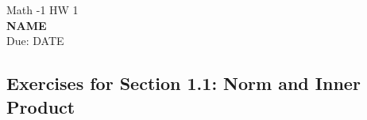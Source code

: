 




\begin{center}
{\Large Math -1 \hspace{0.5cm} HW 1}\\
\textbf{NAME}\\ %
Due: DATE %
\end{center}

\vspace{0.2 cm}


\subsection*{Exercises for Section 1.1: Norm and Inner Product}

